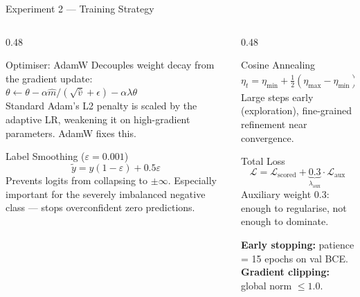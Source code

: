 \documentclass[aspectratio=169, 10pt]{beamer}
\begin{document}
\begin{frame}{Experiment 2 — Training Strategy}
  \begin{columns}[T]
    \begin{column}{0.48\textwidth}
      \begin{block}{Optimiser: AdamW}
        Decouples weight decay from the gradient update:\\
        $\theta \leftarrow \theta - \alpha \hat{m}/(\sqrt{\hat{v}}+\epsilon) - \alpha\lambda\theta$\\[0.3em]
        Standard Adam's L2 penalty is scaled by the adaptive
        LR, weakening it on high-gradient parameters.
        AdamW fixes this.
      \end{block}
      \vspace{0.4em}
      \begin{block}{Label Smoothing ($\varepsilon = 0.001$)}
        \[ \tilde{y} = y(1-\varepsilon) + 0.5\varepsilon \]
        Prevents logits from collapsing to $\pm\infty$.
        Especially important for the severely imbalanced
        negative class — stops overconfident zero predictions.
      \end{block}
    \end{column}
    \begin{column}{0.48\textwidth}
      \begin{block}{Cosine Annealing}
        \[ \eta_t = \eta_{\min} + \tfrac{1}{2}(\eta_{\max}-\eta_{\min})
           \!\left(1+\cos\tfrac{\pi t}{T_{\max}}\right) \]
        Large steps early (exploration), fine-grained
        refinement near convergence.
      \end{block}
      \vspace{0.4em}
      \begin{block}{Total Loss}
        \[ \mathcal{L} = \mathcal{L}_{\text{scored}} +
           \underbrace{0.3}_{\lambda_{\text{aux}}} \cdot \mathcal{L}_{\text{aux}} \]
        Auxiliary weight 0.3: enough to regularise,
        not enough to dominate.
      \end{block}
      \vspace{0.3em}
      \textbf{Early stopping:} patience = 15 epochs on val BCE.\\
      \textbf{Gradient clipping:} global norm $\leq 1.0$.
    \end{column}
  \end{columns}
\end{frame}

\end{document}
